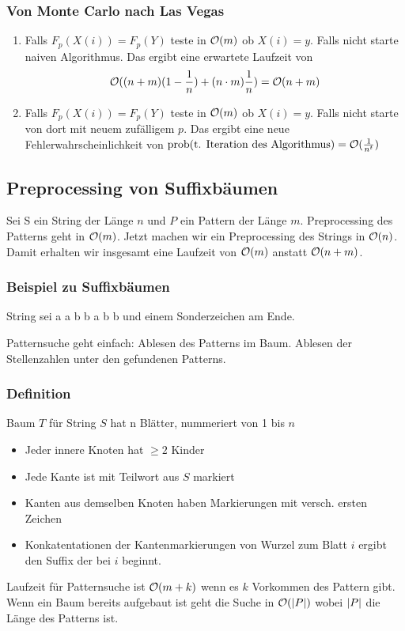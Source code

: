         \subsubsection{Von Monte Carlo nach Las Vegas}
        \begin{enumerate}
            \item Falls $F_p(X(i)) = F_p(Y)$ teste in $\mathcal{O}(m)$ ob $X(i) = y$. Falls nicht starte naiven Algorithmus. Das ergibt eine erwartete Laufzeit von 
            $$
                \mathcal{O}((n+m)(1-\frac{1}{n})+(n\cdot m) \frac{1}{n}) = \mathcal{O}(n+m)
            $$
            \item Falls $F_p(X(i)) = F_p(Y)$ teste in $\mathcal{O}(m)$ ob $X(i) = y$. Falls nicht starte von dort mit neuem zufälligem $p$. Das ergibt eine neue Fehlerwahrscheinlichkeit von $\text{prob(t. Iteration des Algorithmus)}=\mathcal{O}(\frac{1}{n^t})$       
        \end{enumerate}
        
        
    \subsection{Preprocessing von Suffixbäumen}
        Sei S ein String der Länge $n$ und $P$ ein Pattern der Länge $m$. Preprocessing des Patterns geht in $\mathcal{O}(m)$. Jetzt machen wir ein Preprocessing des Strings in $\mathcal{O}(n)$. Damit erhalten wir insgesamt eine Laufzeit von $\mathcal{O}(m)$ anstatt $\mathcal{O}(n+m)$.
        
        \subsubsection{Beispiel zu Suffixbäumen}
            String sei a a b b a b b und einem Sonderzeichen am Ende.
            
            
            Patternsuche geht einfach: Ablesen des Patterns im Baum. Ablesen der Stellenzahlen unter den gefundenen Patterns.
            
        \subsubsection{Definition}
            Baum $T$ für String $S$ hat n Blätter, nummeriert von 1 bis $n$
            \begin{itemize}
                \item Jeder innere Knoten hat $\geq 2$ Kinder
                \item Jede Kante ist mit Teilwort aus $S$ markiert
                \item Kanten aus demselben Knoten haben Markierungen mit versch. ersten Zeichen
                \item Konkatentationen der Kantenmarkierungen von Wurzel zum Blatt $i$ ergibt den Suffix der bei $i$ beginnt.
            \end{itemize}
            Laufzeit für Patternsuche ist $\mathcal{O}(m+k)$ wenn es $k$ Vorkommen des Pattern gibt. Wenn ein Baum bereits aufgebaut ist geht die Suche in $\mathcal{O}(\lvert P\rvert)$ wobei $\lvert P\rvert$ die Länge des Patterns ist.
            
